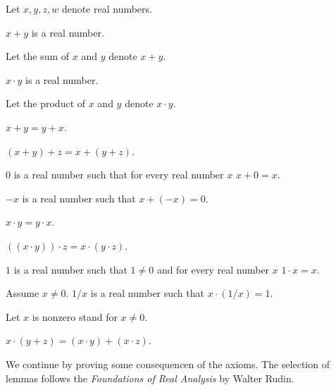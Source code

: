 \documentclass{article}
\begin{document}
\begin{forthel}
Let $x,y,z,w$ denote real numbers.

\begin{signature}
$x + y$ is a real number.
\end{signature}
Let the sum of $x$ and $y$ denote $x + y$.

\begin{signature}
$x \cdot y$ is a real number.
\end{signature}
Let the product of $x$ and $y$ denote $x \cdot y$.

\begin{axiom}
$x + y = y + x$.
\end{axiom}

\begin{axiom}
$(x + y) + z = x + (y + z)$.
\end{axiom}

\begin{signature}
$0$ is a real number such that
for every real number $x$ $x + 0 = x$.
\end{signature}

\begin{signature}
$-x$ is a real number such that $x + (-x) = 0$.
\end{signature}

\begin{axiom}
$x \cdot y = y \cdot x$.
\end{axiom}

\begin{axiom}
$((x \cdot y)) \cdot z = x \cdot (y \cdot z)$.
\end{axiom}

\begin{signature}
$1$ is a real number such that $1 \neq 0$ and
for every real number $x$ $1 \cdot x = x$.
\end{signature}

\begin{signature}
Assume $x \neq 0$. $1/x$ is a real number
such that $x \cdot (1/x) = 1$.
\end{signature}

Let $x$ is nonzero stand for $x \neq 0$.

\begin{axiom}
$x \cdot (y + z) = (x \cdot y) + (x \cdot z)$.
\end{axiom}
\end{forthel}
We continue by proving some consequencen of the axioms.
The selection of lemmas follows the
{\em Foundations of Real Analysis} by Walter Rudin.
\end{document}
